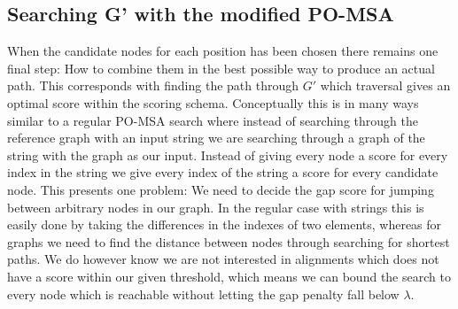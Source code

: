 \documentclass{article}
\begin{document}
\subsection{Searching G' with the modified PO-MSA}
When the candidate nodes for each position has been chosen there remains one final step: How to combine them in the best possible way to produce an actual path. This corresponds with finding the path through $G'$ which traversal gives an optimal score within the scoring schema. Conceptually this is in many ways similar to a regular PO-MSA search where instead of searching through the reference graph with an input string we are searching through a graph of the string with the graph as our input. Instead of giving every node a score for every index in the string we give every index of the string a score for every candidate node. This presents one problem: We need to decide the gap score for jumping between arbitrary nodes in our graph. In the regular case with strings this is easily done by taking the differences in the indexes of two elements, whereas for graphs we need to find the distance between nodes through searching for shortest paths. We do however know we are not interested in alignments which does not have a score within our given threshold, which means we can bound the search to every node which is reachable without letting the gap penalty fall below $\lambda$.\\
\par\noindent
\end{document}
